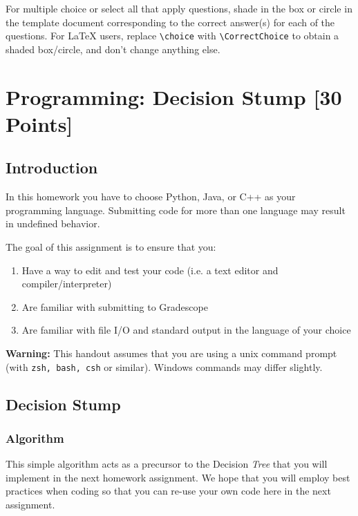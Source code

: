\documentclass[11pt,addpoints,answers]{exam}
\numberwithin{equation}{section} %
\numberwithin{figure}{section} %
\numberwithin{table}{section} %
\begin{document}

For multiple choice or select all that apply questions, shade in the box or circle in the template document corresponding to the correct answer(s) for each of the questions. For \LaTeX{} users, replace \lstinline{\choice} with \lstinline{\CorrectChoice} to obtain a shaded box/circle, and don't change anything else.
\clearpage

%
\section{Programming: Decision Stump [30 Points]} 

\subsection{Introduction}

In this homework you have to choose Python, Java, or C++ as your programming language. Submitting code for more than one language may result in undefined behavior.

The goal of this assignment is to ensure that you:
\begin{enumerate}
    \item Have a way to edit and test your code (i.e. a text editor and compiler/interpreter)
    \item Are familiar with submitting to Gradescope
    \item Are familiar with file I/O and standard output in the language of your choice
\end{enumerate}

\textbf{Warning:} This handout assumes that you are using a unix command prompt (with \texttt{zsh, bash, csh} or similar). Windows commands may differ slightly.

\subsection{Decision Stump}

\subsubsection{Algorithm}

This simple algorithm acts as a precursor to the Decision \emph{Tree} that you will implement in the next homework assignment. We hope that you will employ best practices when coding so that you can re-use your own code here in the next assignment. 
\end{document}
